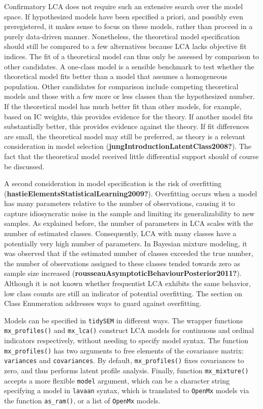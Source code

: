 \documentclass[
  ,man,floatsintext]{apa6}
\begin{document}
Confirmatory LCA does not require such an extensive search over the
model space. If hypothesized models have been specified a priori, and
possibly even preregistered, it makes sense to focus on these models,
rather than proceed in a purely data-driven manner. Nonetheless, the
theoretical model specification should still be compared to a few
alternatives because LCA lacks objective fit indices. The fit of a
theoretical model can thus only be assessed by comparison to other
candidates. A one-class model is a sensible benchmark to test whether
the theoretical model fits better than a model that assumes a
homogeneous population. Other candidates for comparison include
competing theoretical models and those with a few more or less classes
than the hypothesized number. If the theoretical model has much better
fit than other models, for example, based on IC weights, this provides
evidence for the theory. If another model fits substantially better,
this provides evidence against the theory. If fit differences are small,
the theoretical model may still be preferred, as theory is a relevant
consideration in model selection (\textbf{jungIntroductionLatentClass2008?}). The
fact that the theoretical model received little differential support
should of course be discussed.

A second consideration in model specification is the risk of overfitting
(\textbf{hastieElementsStatisticalLearning2009?}). Overfitting occurs when a
model has many parameters relative to the number of observations,
causing it to capture idiosyncratic noise in the sample and limiting its
generalizability to new samples. As explained before, the number of
parameters in LCA scales with the number of estimated classes.
Consequently, LCA with many classes have a potentially very high number
of parameters. In Bayesian mixture modeling, it was observed that if the
estimated number of classes exceeded the true number, the number of
observations assigned to these classes tended towards zero as sample
size increased (\textbf{rousseauAsymptoticBehaviourPosterior2011?}). Although it
is not known whether frequentist LCA exhibits the same behavior, low
class counts are still an indicator of potential overfitting. The
section on Class Enumeration addresses ways to guard against
overfitting.

Models can be specified in \texttt{tidySEM} in different ways. The wrapper
functions \texttt{mx\_profiles()} and \texttt{mx\_lca()} construct LCA models for
continuous and ordinal indicators respectively, without needing to
specify model syntax. The function \texttt{mx\_profiles()} has two arguments to
free elements of the covariance matrix: \texttt{variances} and \texttt{covariances}.
By default, \texttt{mx\_profiles()} fixes covariances to zero, and thus performs
latent profile analysis. Finally, function \texttt{mx\_mixture()} accepts a more
flexible \texttt{model} argument, which can be a character string specifying a
model in \texttt{lavaan} syntax, which is translated to \texttt{OpenMx} models via the
function \texttt{as\_ram()}, or a list of \texttt{OpenMx} models.
\end{document}
